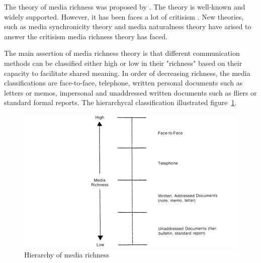 \documentclass[english,12pt,a4paper,pdftex]{article}
\begin{document}
The theory of media richness was proposed by \citet{daft1986}. The theory is well-known and widely supported. However, it has been faces a lot of critisism \citep{dennis1999} \citep{korkala2006}. New theories, such as media synchronicity theory and media naturalness theory have arised to answer the critisism media richness theory has faced.

The main assertion of media richness theory is that different communication methods can be classified either high or low in their "richness" based on their capacity to facilitate shared meaning. In order of decreasing richness, the media classifications are face-to-face, telephone, written personal documents such as letters or memos, impersonal and unaddressed written documents such as fliers or standard formal reports. The hierarchycal classification illustrated figure~\ref{fig:hierarchy_of_media_richness}.

\begin{figure}[htb]
\begin{center}
\includegraphics[width=1.0\textwidth]{hierarchy_of_media_richness.png}
\end{center}
\caption{Hierarchy of media richness \citep{daft1987}}
\label{fig:hierarchy_of_media_richness}
\end{figure}
\end{document}
